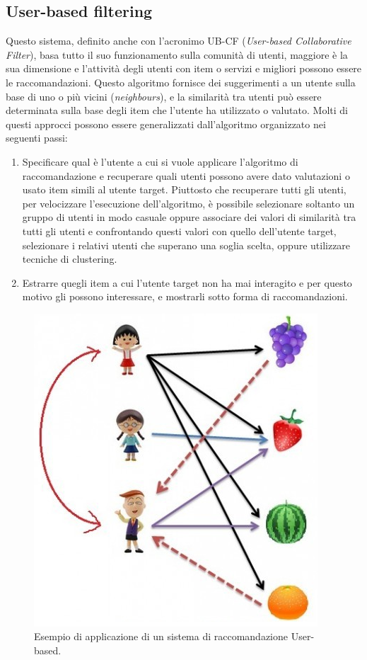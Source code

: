 \subsection{User-based filtering} 
Questo sistema, definito anche con l'acronimo UB-CF (\textit{User-based Collaborative Filter}), basa tutto il suo funzionamento sulla 
comunità di utenti, maggiore è la sua dimensione e l'attività degli utenti con item o servizi e migliori possono essere le 
raccomandazioni. Questo algoritmo fornisce dei suggerimenti a un utente sulla base di uno o più vicini (\textit{neighbours}), e la similarità 
tra utenti può essere determinata sulla base degli item che l'utente ha utilizzato o valutato.\hfill\break
Molti di questi approcci possono essere generalizzati dall'algoritmo organizzato nei seguenti passi:
\begin{enumerate}
    \item Specificare qual è l'utente a cui si vuole applicare l'algoritmo di raccomandazione e recuperare quali utenti possono 
    avere dato valutazioni o usato item simili al utente target. Piuttosto che recuperare tutti gli utenti, per velocizzare l'esecuzione
    dell'algoritmo, è possibile selezionare soltanto un gruppo di utenti in modo casuale oppure associare dei valori di similarità tra 
    tutti gli utenti e confrontando questi valori con quello dell'utente target, selezionare i relativi utenti che superano una soglia
    scelta, oppure utilizzare tecniche di clustering.
    \item Estrarre quegli item a cui l'utente target non ha mai interagito e per questo motivo gli possono interessare, e mostrarli 
    sotto forma di raccomandazioni.
\end{enumerate}
\begin{figure}[ht!]
    \centering
    \includegraphics[scale=0.5]{images/UB_CF_ex.png}
    \caption{Esempio di applicazione di un sistema di raccomandazione User-based.}
    \label{fig:UB_CF}
\end{figure}
